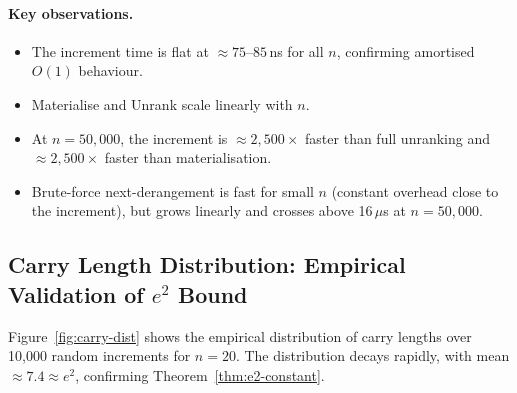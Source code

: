 \documentclass[11pt,a4paper]{article}
\begin{document}
    \paragraph{Key observations.}
    \begin{itemize}
        \item The increment time is flat at $\approx 75$--$85$\,ns for all $n$,
        confirming amortised $O(1)$ behaviour.
        \item Materialise and Unrank scale linearly with $n$.
        \item At $n = 50{,}000$, the increment is $\approx 2{,}500\times$ faster than
        full unranking and $\approx 2{,}500\times$ faster than materialisation.
        \item Brute-force next-derangement is fast for small $n$ (constant overhead
        close to the increment), but grows linearly and crosses above 16\,$\mu$s
        at $n = 50{,}000$.
    \end{itemize}

    \subsection{Carry Length Distribution: Empirical Validation of $e^2$ Bound}

    Figure~\ref{fig:carry-dist} shows the empirical distribution of carry lengths
    over 10,000 random increments for $n=20$. The distribution decays rapidly,
    with mean $\approx 7.4 \approx e^2$, confirming Theorem~\ref{thm:e2-constant}.
\end{document}
